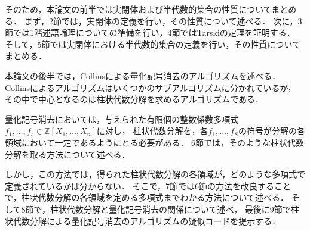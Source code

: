 \documentclass[uplatex, dvipdfmx]{jsarticle}
\theoremstyle{definition}
\begin{document}
そのため，本論文の前半では実閉体および半代数的集合の性質についてまとめる．
まず，2節では，実閉体の定義を行い，その性質について述べる．
次に，3節では1階述語論理についての準備を行い，4節ではTarskiの定理を証明する．
そして，5節では実閉体における半代数的集合の定義を行い，その性質についてまとめる．

本論文の後半では，Collinsによる量化記号消去のアルゴリズムを述べる．
Collinsによるアルゴリズムはいくつかのサブアルゴリズムに分かれているが，
その中で中心となるのは柱状代数分解を求めるアルゴリズムである．

量化記号消去においては，与えられた有限個の整数係数多項式$f_1, \dots, f_s \in \mathbb{Z}[X_1, \dots, X_n]$に対し，
柱状代数分解を，各$f_1, \dots, f_S$の符号が分解の各領域において一定であるようにとる必要がある．
6節では，そのような柱状代数分解を取る方法について述べる．

しかし，この方法では，得られた柱状代数分解の各領域が，どのような多項式で定義されているかは分からない．
そこで，7節では6節の方法を改良することで，柱状代数分解の各領域を定める多項式までわかる方法について述べる．
そして8節で，柱状代数分解と量化記号消去の関係について述べ，
最後に9節で柱状代数分解による量化記号消去のアルゴリズムの疑似コードを提示する．



\end{document}
